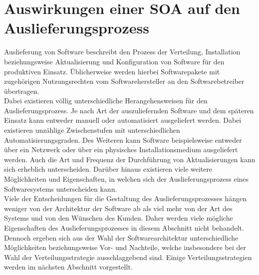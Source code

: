 \section{Auswirkungen einer SOA auf den Auslieferungsprozess}
\label{ch:deliveryProcess}
Auslieferung von Software beschreibt den Prozess der Verteilung, Installation beziehungsweise Aktualisierung und Konfiguration von Software für den produktiven Einsatz. Üblicherweise werden hierbei Softwarepakete mit zugehörigen Nutzungsrechten vom Softwarehersteller an den Softwarebetreiber übertragen.\\
Dabei existieren völlig unterschiedliche Herangehensweisen für den Auslieferungsprozess. Je nach Art der auszuliefernden Software und dem späteren Einsatz kann entweder manuell oder automatisiert ausgeliefert werden. Dabei existieren unzählige Zwischenstufen mit unterschiedlichen Automatisierungsgraden. Des Weiteren kann Software beispielsweise entweder über ein Netzwerk oder über ein physisches Installationsmedium ausgeliefert werden. Auch die Art und Frequenz der Durchführung von Aktualisierungen kann sich erheblich unterscheiden. Darüber hinaus existieren viele weitere Möglichkeiten und Eigenschaften, in welchen sich der Auslieferungsprozess eines Softwaresystems unterscheiden kann.\\
Viele der Entscheidungen für die Gestaltung des Auslieferungsprozesses hängen weniger von der Architektur der Software ab als viel mehr von der Art des Systems und von den Wünschen des Kunden. Daher werden viele mögliche Eigenschaften des Auslieferungsprozesses in diesem Abschnitt nicht behandelt. Dennoch ergeben sich aus der Wahl der Softwarearchitektur unterschiedliche Möglichkeiten beziehungsweise Vor- und Nachteile, welche insbesondere bei der Wahl der Verteilungsstrategie ausschlaggebend sind. Einige Verteilungsstrategien werden im nächsten Abschnitt vorgestellt.

